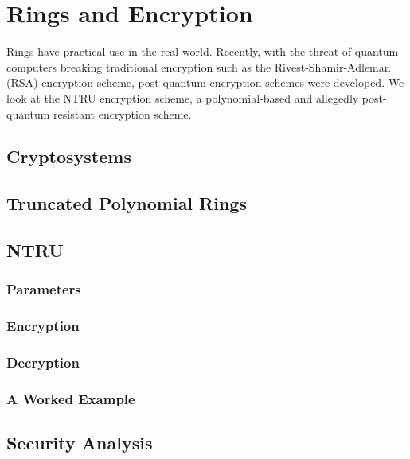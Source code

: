 \chapter{Rings and Encryption}
Rings have practical use in the real world. Recently, with the threat of quantum computers breaking traditional encryption such as the Rivest-Shamir-Adleman (RSA) encryption scheme, post-quantum encryption schemes were developed. We look at the NTRU encryption scheme, a polynomial-based and allegedly post-quantum resistant encryption scheme.

\section{Cryptosystems}

\section{Truncated Polynomial Rings}

\section{NTRU}

\subsection{Parameters}

\subsection{Encryption}

\subsection{Decryption}

\subsection{A Worked Example}

\section{Security Analysis}
